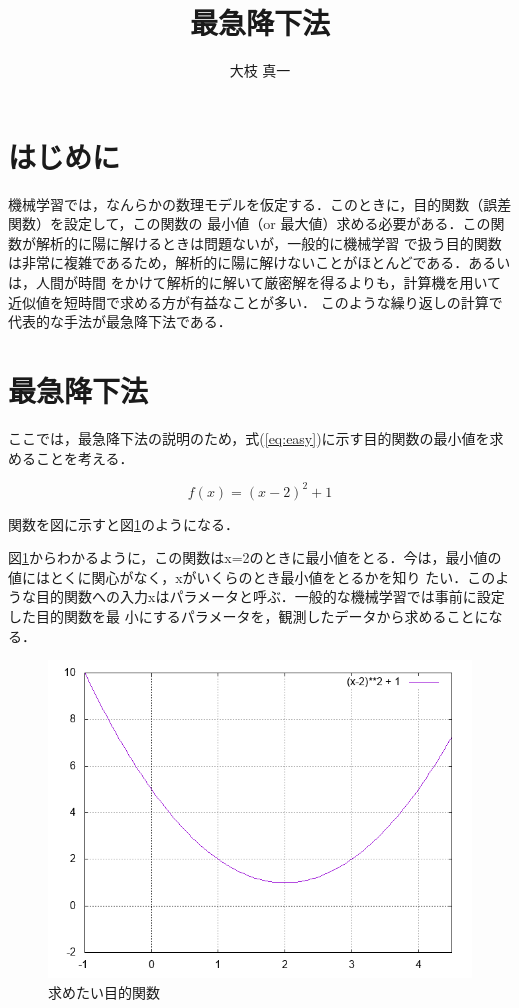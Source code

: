 \documentclass[12pt]{jsarticle}
\title{最急降下法}
\author{大枝 真一}
\date{}
\begin{document}
\maketitle

\section{はじめに}
機械学習では，なんらかの数理モデルを仮定する．このときに，目的関数（誤差関数）を設定して，この関数の
最小値（or 最大値）求める必要がある．この関数が解析的に陽に解けるときは問題ないが，一般的に機械学習
で扱う目的関数は非常に複雑であるため，解析的に陽に解けないことがほとんどである．あるいは，人間が時間
をかけて解析的に解いて厳密解を得るよりも，計算機を用いて近似値を短時間で求める方が有益なことが多い．
このような繰り返しの計算で代表的な手法が最急降下法である．

\section{最急降下法}
ここでは，最急降下法の説明のため，式(\ref{eq:easy})に示す目的関数の最小値を求めることを考える．

\begin{equation}
  f(x)=(x-2)^2 + 1
  \label{eq:easy}
\end{equation}

関数を図に示すと図\ref{fig:easy}のようになる．

図\ref{fig:easy}からわかるように，この関数はx=2のときに最小値をとる．今は，最小値の値にはとくに関心がなく，xがいくらのとき最小値をとるかを知り
たい．このような目的関数への入力xはパラメータと呼ぶ．一般的な機械学習では事前に設定した目的関数を最
小にするパラメータを，観測したデータから求めることになる．

\begin{figure}[ht]
  \begin{center}
    \includegraphics[scale=0.6]{fig/easy.png}
  \end{center}
  \caption{求めたい目的関数}
  \label{fig:easy}
\end{figure}
\end{document}
